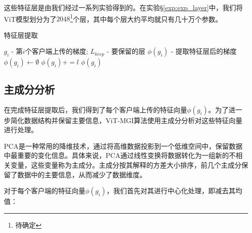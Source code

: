 \documentclass[conference]{IEEEtran}
\begin{document}
这些特征层是由我们经过一系列实验得到的。在实验\hyperref[exp:exp_layer]{§\ref{exp:exp_layer}}中，我们将ViT模型划分为了$2048$\footnote{待确定}个层，其中每个层大约平均就只有几十万个参数。


\begin{algorithm}
    \caption{特征层提取}
    \label{alg:example}
    \begin{algorithmic}[1]
        \Require $g_i$ - 第$i$个客户端上传的梯度; $L_{keep}$ - 要保留的层
        \Ensure $\phi(g_i)$ - 提取特征层后的梯度
            \State $\phi(g_i)\gets\emptyset$
                    \State $\phi(g_i) += l$
                \EndIf
            \EndFor
            \State \Return $\phi(g_i)$
        \EndFunction
    \end{algorithmic}
\end{algorithm}

\subsection{主成分分析}
\label{sec:method_PCA}

在完成特征层提取后，我们得到了每个客户端上传的特征向量$\phi(g_i)$。为了进一步简化数据结构并保留主要信息，ViT-MGI算法使用主成分分析对这些特征向量进行处理。

PCA是一种常用的降维技术，通过将高维数据投影到一个低维空间中，保留数据中最重要的变化信息。具体来说，PCA通过线性变换将数据转化为一组新的不相关变量，这些变量称为主成分。主成分按其解释的方差大小排序，前几个主成分保留了数据中的主要信息，从而减少了数据维度。

对于每个客户端的特征向量$\phi(g_i)$，我们首先对其进行中心化处理，即减去其均值：
\end{document}
